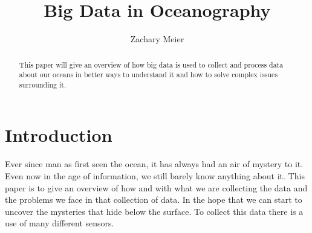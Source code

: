 \documentclass[sigconf]{acmart}
\begin{document}
\title{Big Data in Oceanography}
\author{Zachary Meier}
\renewcommand{\shortauthors}{Z. Meier et al.}
\begin{abstract}

  This paper will give an overview of how big data is used to collect
  and process data about our oceans in better ways to understand it
  and how to solve complex issues surrounding it.
 
\end{abstract}
\maketitle
\section{Introduction}

Ever since man as first seen the ocean, it has always had an air of
mystery to it.  Even now in the age of information, we still barely
know anything about it.  This paper is to give an overview of how and
with what we are collecting the data and the problems we face in that
collection of data.  In the hope that we can start to uncover the
mysteries that hide below the surface. To collect this data there is a
use of many different sensors. \cite{NOAA}
\end{document}
